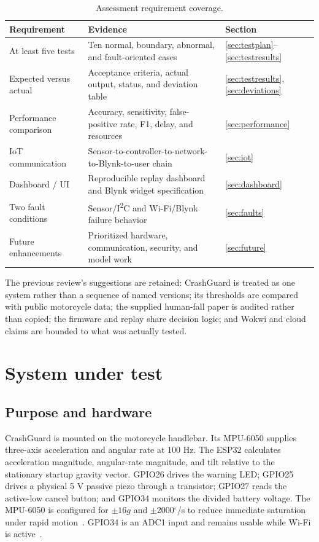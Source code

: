 \documentclass[12pt,a4paper]{article}
\newcommand{\degree}{\ensuremath{^{\circ}}}
\begin{document}
\begin{table}[H]
\centering
\small
\caption{Assessment requirement coverage.}
\label{tab:coverage}
\begin{tabularx}{\textwidth}{@{}p{}X p{}@{}}
\toprule
Requirement & Evidence & Section \\
\midrule
At least five tests & Ten normal, boundary, abnormal, and fault-oriented cases & \ref{sec:testplan}--\ref{sec:testresults} \\
Expected versus actual & Acceptance criteria, actual output, status, and deviation table & \ref{sec:testresults}, \ref{sec:deviations} \\
Performance comparison & Accuracy, sensitivity, false-positive rate, F1, delay, and resources & \ref{sec:performance} \\
IoT communication & Sensor-to-controller-to-network-to-Blynk-to-user chain & \ref{sec:iot} \\
Dashboard / UI & Reproducible replay dashboard and Blynk widget specification & \ref{sec:dashboard} \\
Two fault conditions & Sensor/I\textsuperscript{2}C and Wi-Fi/Blynk failure behavior & \ref{sec:faults} \\
Future enhancements & Prioritized hardware, communication, security, and model work & \ref{sec:future} \\
\bottomrule
\end{tabularx}
\end{table}

The previous review's suggestions are retained: CrashGuard is treated as one
system rather than a sequence of named versions; its thresholds are compared
with public motorcycle data; the supplied human-fall paper is audited rather
than copied; the firmware and replay share decision logic; and Wokwi and cloud
claims are bounded to what was actually tested.

\section{System under test}

\subsection{Purpose and hardware}

CrashGuard is mounted on the motorcycle handlebar. Its MPU-6050 supplies
three-axis acceleration and angular rate at 100 Hz. The ESP32 calculates
acceleration magnitude, angular-rate magnitude, and tilt relative to the
stationary startup gravity vector. GPIO26 drives the warning LED; GPIO25 drives
a physical 5 V passive piezo through a transistor; GPIO27 reads the active-low
cancel button; and GPIO34 monitors the divided battery voltage. The MPU-6050 is
configured for $\pm16g$ and $\pm2000\degree$/s to reduce immediate saturation
under rapid motion~\cite{mpu6050datasheet}. GPIO34 is an ADC1 input and remains
usable while Wi-Fi is active~\cite{esp32datasheet}.
\end{document}
